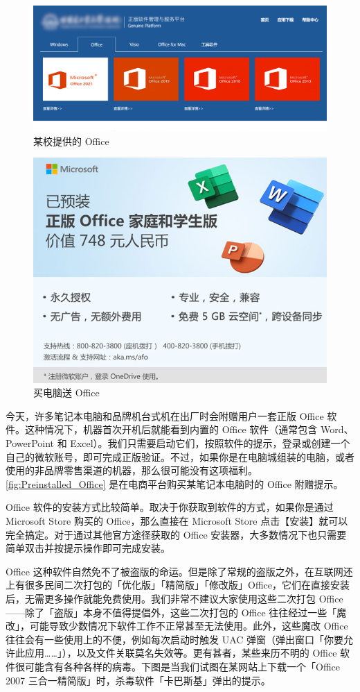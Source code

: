 \begin{figure}[htb!]
  \centering
  \includegraphics[width=.8\textwidth]{assets/software/Geniune_platform.png}
  \caption{某校提供的 Office}
  \label{fig:Geniune_platform}
\end{figure}

\begin{figure}[tb!]
  \centering
  \includegraphics[width=.5\textwidth]{assets/software/Preinstalled_Office.png}
  \caption{买电脑送 Office}
  \label{fig:Preinstalled_Office}
\end{figure}

今天，许多笔记本电脑和品牌机台式机在出厂时会附赠用户一套正版 Office 软件。这种情况下，机器首次开机后就能看到内置的 Office 软件（通常包含 Word、PowerPoint 和 Excel）。我们只需要启动它们，按照软件的提示，登录或创建一个自己的微软账号，即可完成正版验证。不过，如果你是在电脑城组装的电脑，或者使用的非品牌零售渠道的机器，那么很可能没有这项福利。\autoref{fig:Preinstalled_Office} 是在电商平台购买某笔记本电脑时的 Office 附赠提示。

Office 软件的安装方式比较简单。取决于你获取到软件的方式，如果你是通过 Microsoft Store 购买的 Office，那么直接在 Microsoft Store 点击【安装】就可以完全搞定。对于通过其他官方途径获取的 Office 安装器，大多数情况下也只需要简单双击并按提示操作即可完成安装。

Office 这种软件自然免不了被盗版的命运。但是除了常规的盗版之外，在互联网还上有很多民间二次打包的「优化版」「精简版」「修改版」Office，它们在直接安装后，无需更多操作就能免费使用。我们非常不建议大家使用这些二次打包 Office——除了「盗版」本身不值得提倡外，这些二次打包的 Office 往往经过一些「魔改」，可能导致少数情况下软件工作不正常甚至无法使用。此外，这些魔改 Office 往往会有一些使用上的不便，例如每次启动时触发 UAC 弹窗（弹出窗口「你要允许此应用……」），以及文件关联莫名失效等。更有甚者，某些来历不明的 Office 软件很可能含有各种各样的病毒。下图是当我们试图在某网站上下载一个「Office 2007 三合一精简版」时，杀毒软件「卡巴斯基」弹出的提示。

